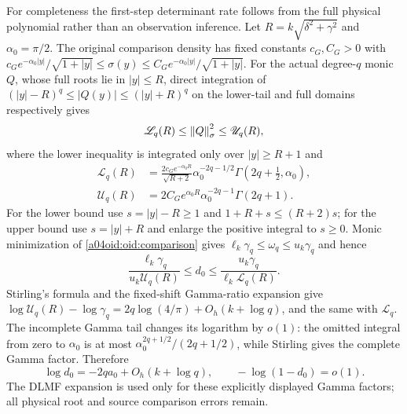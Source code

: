 For completeness the first-step determinant rate follows from the
full physical polynomial rather than an observation inference.
Let $R=k\sqrt{\delta^2+\gamma^2}$ and $\alpha_0=\pi/2$.
The original comparison density has fixed constants $c_G,C_G>0$
with
$c_Ge^{-\alpha_0|y|}/\sqrt{1+|y|}\le\sigma(y)
\le C_Ge^{-\alpha_0|y|}/\sqrt{1+|y|}$.
For the actual degree-$q$ monic $Q$, whose full roots lie in
$|y|\le R$, direct integration of
$(|y|-R)^q\le |Q(y)|\le(|y|+R)^q$ on the lower-tail and full
domains respectively gives
\[
 \mathscr L_q(R)\le\left\lVert Q\right\rVert_\sigma^2\le\mathscr U_q(R),
\]
where the lower inequality is integrated only over $|y|\ge R+1$ and
\begin{align*}
 \mathscr L_q(R)&=\frac{2c_Ge^{-\alpha_0R}}{\sqrt{R+2}}
 \alpha_0^{-2q-1/2}\Gamma(2q+\tfrac12,\alpha_0),\\
 \mathscr U_q(R)&=2C_Ge^{\alpha_0R}
 \alpha_0^{-2q-1}\Gamma(2q+1).
\end{align*}
For the lower bound use $s=|y|-R\ge1$ and
$1+R+s\le(R+2)s$; for the upper bound use $s=|y|+R$ and
enlarge the positive integral to $s\ge0$. Monic minimization of
\eqref{a04oid:oid:comparison} gives
$\ell_k\gamma_q\le\omega_q\le u_k\gamma_q$ and hence
\begin{equation}\label{a04oid:oid:finited0}
 \frac{\ell_k\gamma_q}{u_k\mathscr U_q(R)}
 \le d_0\le
 \frac{u_k\gamma_q}{\ell_k\mathscr L_q(R)}.
\end{equation}
Stirling's formula and the fixed-shift Gamma-ratio expansion
\cite[\S5.11(i), (iii)]{a04oid:DLMF5} give
$\log\mathscr U_q(R)-\log\gamma_q
=2q\log(4/\pi)+O_h(k+\log q)$, and the same with
$\mathscr L_q$. The incomplete Gamma tail changes its logarithm
by $o(1)$: the omitted integral from zero to $\alpha_0$ is at most
$\alpha_0^{2q+1/2}/(2q+1/2)$, while Stirling gives the complete
Gamma factor. Therefore
\begin{equation}\label{a04oid:oid:d0rate}
 \log d_0=-2qa_0+O_h(k+\log q),\qquad
 -\log(1-d_0)=o(1).
\end{equation}
The DLMF expansion is used only for these explicitly displayed
Gamma factors; all physical root and source comparison errors remain.

